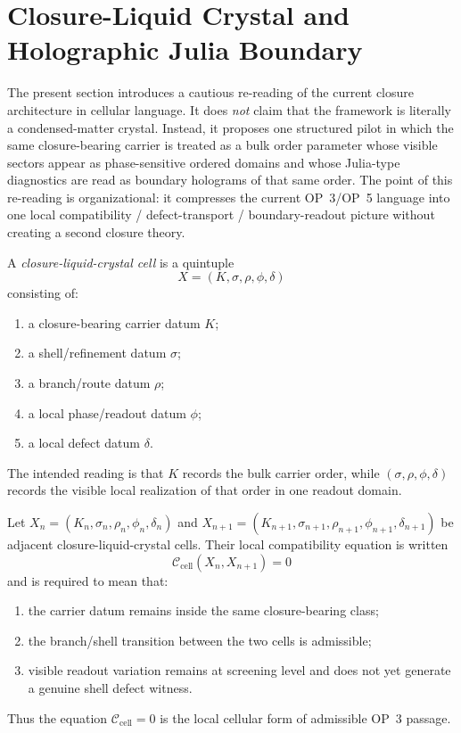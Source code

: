 \section{Closure-Liquid Crystal and Holographic Julia Boundary}
\label{sec:closure-liquid-crystal-holographic-julia-boundary}

The present section introduces a cautious re-reading of the current closure architecture in cellular language. It does \emph{not} claim that the framework is literally a condensed-matter crystal. Instead, it proposes one structured pilot in which the same closure-bearing carrier is treated as a bulk order parameter whose visible sectors appear as phase-sensitive ordered domains and whose Julia-type diagnostics are read as boundary holograms of that same order. The point of this re-reading is organizational: it compresses the current OP~3/OP~5 language into one local compatibility / defect-transport / boundary-readout picture without creating a second closure theory.

\begin{definition}
\label{def:closure-liquid-crystal-cell}
A \emph{closure-liquid-crystal cell} is a quintuple
\[
  X=(K,\sigma,\rho,\phi,\delta)
\]
consisting of:
\begin{enumerate}[leftmargin=2em,label=(\roman*)]
  \item a closure-bearing carrier datum $K$;
  \item a shell/refinement datum $\sigma$;
  \item a branch/route datum $\rho$;
  \item a local phase/readout datum $\phi$;
  \item a local defect datum $\delta$.
\end{enumerate}
The intended reading is that $K$ records the bulk carrier order, while $(\sigma,\rho,\phi,\delta)$ records the visible local realization of that order in one readout domain.
\end{definition}

\begin{definition}
\label{def:local-cell-compatibility-equation}
Let $X_n=(K_n,\sigma_n,\rho_n,\phi_n,\delta_n)$ and
$X_{n+1}=(K_{n+1},\sigma_{n+1},\rho_{n+1},\phi_{n+1},\delta_{n+1})$
be adjacent closure-liquid-crystal cells. Their local compatibility equation is written
\[
  \mathcal C_{\mathrm{cell}}(X_n,X_{n+1})=0
\]
and is required to mean that:
\begin{enumerate}[leftmargin=2em,label=(\roman*)]
  \item the carrier datum remains inside the same closure-bearing class;
  \item the branch/shell transition between the two cells is admissible;
  \item visible readout variation remains at screening level and does not yet generate a genuine shell defect witness.
\end{enumerate}
Thus the equation $\mathcal C_{\mathrm{cell}}=0$ is the local cellular form of admissible OP~3 passage.
\end{definition}

